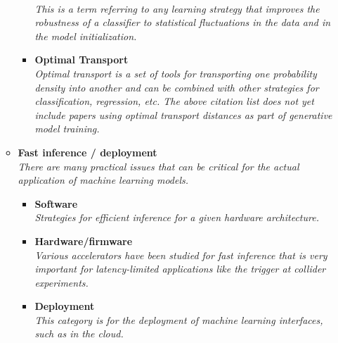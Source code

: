 \documentclass[12pt,letterpaper]{article}
\begin{document}
\begin{itemize}
\begin{itemize}
\begin{itemize}
				\\\textit{This is a term referring to any learning strategy that improves the robustness of a classifier to statistical fluctuations in the data and in the model initialization.}
				\item \textbf{Optimal Transport}~\cite{Komiske:2019fks,Cai:2020vzx,Romao:2020ojy,Pollard:2021fqv,Cai:2021hnn,Manole:2022bmi,Gouskos:2022xvn,ATLAS:2023mny,Bright-Thonney:2023sqf}
				\\\textit{Optimal transport is a set of tools for transporting one probability density into another and can be combined with other strategies for classification, regression, etc.  The above citation list does not yet include papers using optimal transport distances as part of generative model training.}
			\end{itemize}
		\item \textbf{Fast inference / deployment}
		\\\textit{There are many practical issues that can be critical for the actual application of machine learning models.}
			\begin{itemize}
				\item \textbf{Software}~\cite{Strong:2020mge,Gligorov:2012qt,Weitekamp:DLPS2017,Nguyen:2018ugw,Bourgeois:2018nvk,1792136,Balazs:2021uhg,Rehm:2021zow,Mahesh:2021iph,Amrouche:2021tio,Pol:2021iqw,Goncharov:2021wvd,Saito:2021vpp,Jiang:2022zho,Garg:2022tal,Duarte:2022job,Guo:2023nfu,Tyson:2023zkx,DPHEP:2023blx,DiBello:2023kzc}
				\\\textit{Strategies for efficient inference for a given hardware architecture.}
				\item \textbf{Hardware/firmware}~\cite{Duarte:2018ite,DiGuglielmo:2020eqx,Summers:2020xiy,1808088,Iiyama:2020wap,Mohan:2020vvi,Carrazza:2020qwu,Rankin:2020usv,Heintz:2020soy,Rossi:2020sbh,Aarrestad:2021zos,Hawks:2021ruw,Teixeira:2021yhl,Hong:2021snb,DiGuglielmo:2021ide,Migliorini:2021fuj,Govorkova:2021utb,Elabd:2021lgo,Jwa:2019zlh,Butter:2022lkf,Sun:2022bxx,Khoda:2022dwz,Carlson:2022vac,Abidi:2022ogh,MeyerzuTheenhausen:2022ffb,Cai:2023ldc,Herbst:2023lug,Coccaro:2023nol,Neu:2023sfh,Okabe:2023efz,Yaary:2023dvw,Schulte:2023gtt,Yoo:2023lxy}
				\\\textit{Various accelerators have been studied for fast inference that is very important for latency-limited applications like the trigger at collider experiments.}
				\item \textbf{Deployment}~\cite{Kuznetsov:2020mcj,SunnebornGudnadottir:2021nhk,Holmberg:2023rfr}
				\\\textit{This category is for the deployment of machine learning interfaces, such as in the cloud.}

\end{itemize}
\end{itemize}
\end{itemize}
\end{document}
